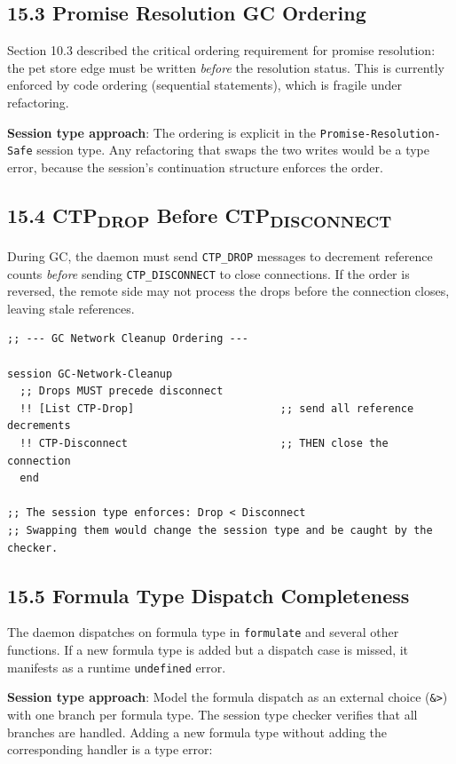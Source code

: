 \documentclass[11pt]{article}
\begin{document}
\subsection{15.3 Promise Resolution GC Ordering}
\label{sec:org34a9720}

Section 10.3 described the critical ordering requirement for promise
resolution: the pet store edge must be written \emph{before} the resolution
status. This is currently enforced by code ordering (sequential statements),
which is fragile under refactoring.

\textbf{Session type approach}: The ordering is explicit in the
\texttt{Promise-Resolution-Safe} session type. Any refactoring that swaps the two
writes would be a type error, because the session's continuation structure
enforces the order.
\subsection{15.4 CTP\textsubscript{DROP} Before CTP\textsubscript{DISCONNECT}}
\label{sec:orgf05711d}

During GC, the daemon must send \texttt{CTP\_DROP} messages to decrement reference
counts \emph{before} sending \texttt{CTP\_DISCONNECT} to close connections. If the order
is reversed, the remote side may not process the drops before the connection
closes, leaving stale references.

\begin{verbatim}
;; --- GC Network Cleanup Ordering ---

session GC-Network-Cleanup
  ;; Drops MUST precede disconnect
  !! [List CTP-Drop]                       ;; send all reference decrements
  !! CTP-Disconnect                        ;; THEN close the connection
  end

;; The session type enforces: Drop < Disconnect
;; Swapping them would change the session type and be caught by the checker.
\end{verbatim}
\subsection{15.5 Formula Type Dispatch Completeness}
\label{sec:orgc59ecb4}

The daemon dispatches on formula type in \texttt{formulate} and several other
functions. If a new formula type is added but a dispatch case is missed,
it manifests as a runtime \texttt{undefined} error.

\textbf{Session type approach}: Model the formula dispatch as an external choice
(\texttt{\&>}) with one branch per formula type. The session type checker verifies
that all branches are handled. Adding a new formula type without adding
the corresponding handler is a type error:
\end{document}
